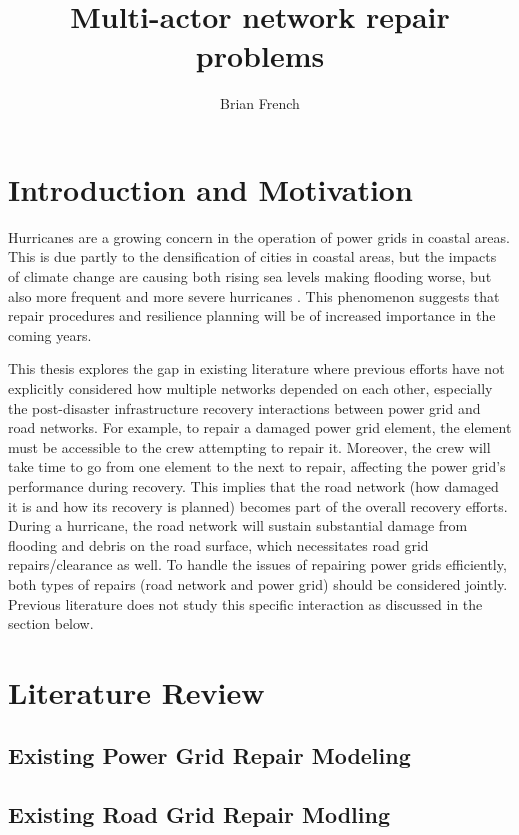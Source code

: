 \documentclass{article}
\begin{document}
	\title{Multi-actor network repair problems}
	\author{Brian French}
	\maketitle
	
	\section{Introduction and Motivation}
	Hurricanes are a growing concern in the operation of power grids in coastal areas. This is due partly to the densification of cities in coastal areas, but the impacts of climate change are causing both rising sea levels making flooding worse, but also more frequent and more severe hurricanes \cite{MannEA2006}. This phenomenon suggests that repair procedures and resilience planning will be of increased importance in the coming years.
	
	This thesis explores the gap in existing literature where previous efforts have not explicitly considered how multiple networks depended on each other, especially the post-disaster infrastructure recovery interactions between power grid and road networks. For example, to repair a damaged power grid element, the element must be accessible to the crew attempting to repair it. Moreover, the crew will take time to go from one element to the next to repair, affecting the power grid's performance during recovery. This implies that the road network (how damaged it is and how its recovery is planned) becomes part of the overall recovery efforts. During a hurricane, the road network will sustain substantial damage from flooding and debris on the road surface, which necessitates road grid repairs/clearance as well. To handle the issues of repairing power grids efficiently, both types of repairs (road network and power grid) should be considered jointly. Previous literature does not study this specific interaction as discussed in the section below.

	\section{Literature Review}
	\subsection{Existing Power Grid Repair Modeling}
	\subsection{Existing Road Grid Repair Modling}
\end{document}
